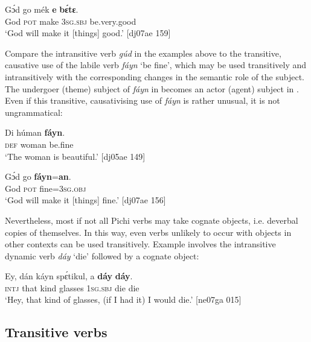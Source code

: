 \ea%
    \label{ex:key:1097}
    \gll Gɔ́d    go  mék    \textbf{e}    \textbf{bɛ́tɛ}.\\
God    \textsc{pot}  make  \textsc{3sg.sbj}  be.very.good\\

\glt ‘God will make it [things] good.’ [dj07ae 159]
\z

Compare the intransitive verb \textit{gúd} in the examples above to the transitive, causative use of the labile verb \textit{fáyn} ‘be fine’, which may be used transitively and intransitively with the corresponding changes in the semantic role of the subject. The undergoer (theme) subject of \textit{fáyn} in  becomes an actor (agent) subject in . Even if this transitive, causativising use of \textit{fáyn} is rather unusual, it is not ungrammatical: 


\ea%
    \label{ex:key:1098}
    \gll Di  húman  \textbf{fáyn}.\\
\textsc{def}  woman  be.fine\\

\glt ‘The woman is beautiful.’ [dj05ae 149]
\z


\ea%
    \label{ex:key:1099}
    \gll Gɔ́d    go  \textbf{fáyn}=\textbf{an}.\\
God    \textsc{pot}  fine=\textsc{3sg.obj}\\

\glt ‘God will make it [things] fine.’ [dj07ae 156]
\z

Nevertheless, most if not all Pichi verbs may take cognate objects, i.e. deverbal copies of themselves. In this way, even verbs unlikely to occur with objects in other contexts can be used transitively. Example  involves the intransitive dynamic verb \textit{dáy} ‘die’ followed by a cognate object: 


\ea%
    \label{ex:key:1100}
    \gll Ey,  dán  káyn  spɛ́tikul,  a    \textbf{dáy}  \textbf{dáy}.\\
\textsc{intj}  that  kind    glasses  \textsc{1sg.sbj}  die  die\\

\glt ‘Hey, that kind of glasses, (if I had it) I would die.’ [ne07ga 015]
\z

\subsection{Transitive verbs}


